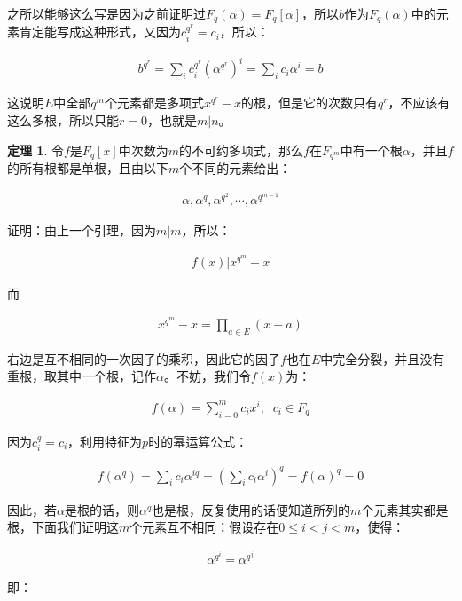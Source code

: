 \documentclass[12pt, a4paper, oneside]{ctexart}
\theoremstyle{definition}
\newtheorem*{theorem}{定理}
\begin{document}
之所以能够这么写是因为之前证明过$F_q(\alpha)=F_q[\alpha]$，所以$b$作为$F_q(\alpha)$中的元素肯定能写成这种形式，又因为$c_i^{q^r}=c_i$，所以：

\begin{align*}
b^{q^r}=\sum_ic_i^{q^r}(\alpha^{q^r})^i=\sum_ic_i\alpha^i=b
\end{align*}

这说明$E$中全部$q^m$个元素都是多项式$x^{q^r}-x$的根，但是它的次数只有$q^r$，不应该有这么多根，所以只能$r=0$，也就是$m|n$。

\begin{theorem}
令$f$是$F_q[x]$中次数为$m$的不可约多项式，那么$f$在$F_{q^m}$中有一个根$\alpha$，并且$f$的所有根都是单根，且由以下$m$个不同的元素给出：

\begin{align*}
\alpha,\alpha^q,\alpha^{q^2},\cdots,\alpha^{q^{m-1}}
\end{align*}
\end{theorem}

证明：由上一个引理，因为$m|m$，所以：

\begin{align*}
f(x)|x^{q^m}-x
\end{align*}

而

\begin{align*}
x^{q^m}-x=\prod_{a\in E}(x-a)
\end{align*}

右边是互不相同的一次因子的乘积，因此它的因子$f$也在$E$中完全分裂，并且没有重根，取其中一个根，记作$\alpha$。不妨，我们令$f(x)$为：

\begin{align*}
f(\alpha)=\sum_{i=0}^mc_ix^i,\;\; c_i\in F_q
\end{align*}

因为$c_i^q=c_i$，利用特征为$p$时的幂运算公式：

\begin{align*}
f(\alpha^q)=\sum_ic_i\alpha^{iq}=(\sum_ic_i\alpha^i)^q=f(\alpha)^q=0
\end{align*}

因此，若$\alpha$是根的话，则$\alpha^q$也是根，反复使用的话便知道所列的$m$个元素其实都是根，下面我们证明这$m$个元素互不相同：假设存在$0\leqslant i<j<m$，使得：

\begin{align*}
\alpha^{q^i}=\alpha^{q^j}
\end{align*}

即：
\end{document}
